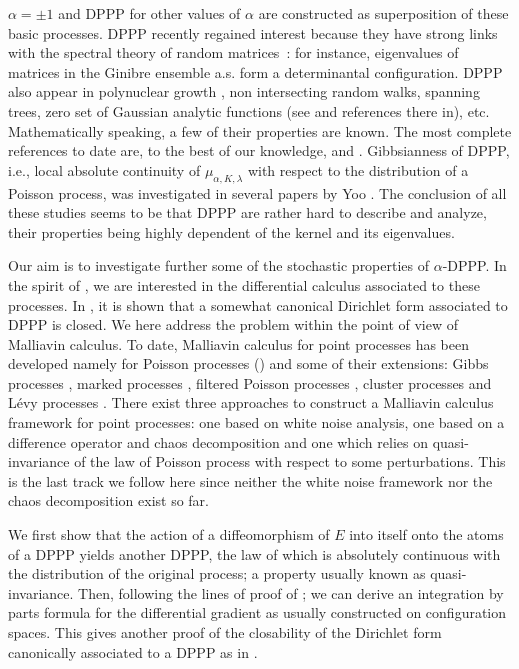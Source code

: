\documentclass[11pt,a4paper]{amsart}
\begin{document}
$\alpha=\pm 1$ and DPPP for other values of $\alpha$ are constructed
as superposition of these basic processes.  DPPP recently regained
interest because they have strong links with the spectral theory of
random matrices~\cite{math-ph0510038,math.PR/0002099}: for instance,
eigenvalues of matrices in the Ginibre ensemble a.s. form a
determinantal configuration.  DPPP also appear in polynuclear growth
\cite{MR2018275,math.PR/0304368}, non intersecting random walks,
spanning trees, zero set of Gaussian analytic functions (see
\cite{MR2216966} and references there in), etc. Mathematically
speaking, a few of their properties are known. The most complete
references to date are, to the best of our knowledge, \cite{MR2216966}
and \cite{MR2018415}. Gibbsianness of DPPP, i.e., local absolute
continuity of $\mu_{\alpha, K,\lambda}$ with respect to the
distribution of a Poisson process, was investigated in several papers
by Yoo \cite{MR2209150,MR2122549}. The conclusion of all these studies
seems to be that DPPP are rather hard to describe and analyze, their
properties being highly dependent of the kernel and its eigenvalues.

Our aim is to investigate further some of the stochastic properties of
$\alpha$-DPPP. In the spirit of \cite{MR2108363}, we are interested in
the differential calculus associated to these processes. In
\cite{MR2108363}, it is shown that a somewhat canonical Dirichlet form
associated to DPPP is closed. We here address the problem within the
point of view of Malliavin calculus. To date, Malliavin calculus for
point processes has been developed namely for Poisson processes
(\cite{bichteler83,bass86,MR2535466,MR99d:58179,MR2531026,Decreusefond:2006wr})
and some of their extensions: Gibbs processes \cite{MR99f:58219},
marked processes \cite{MR2002f:60098}, filtered Poisson processes
\cite{Decreusefond:2006wr}, cluster processes \cite{Bogachev:2007ww}
and Lévy processes \cite{MR2292579,Di-Nunno:2004no}. There exist three
approaches to construct a Malliavin calculus framework for point
processes: one based on white noise analysis, one based on a
difference operator and chaos decomposition and one which relies on
quasi-invariance of the law of Poisson process with respect to some
perturbations. This is the last track we follow here since neither the
white noise framework nor the chaos decomposition exist so far.

We first show that the action of a diffeomorphism of $E$ into itself
onto the atoms of a DPPP yields another DPPP, the law of which is
absolutely continuous with the distribution of the original process; a
property usually known as quasi-invariance. Then, following the lines
of proof of \cite{MR99d:58179,bismut83,Bogachev:2007ww}; we can derive
an integration by parts formula for the differential gradient as
usually constructed on configuration spaces. This gives another proof
of the closability of the Dirichlet form canonically associated to a
DPPP as in \cite{MR2108363}.
\end{document}
